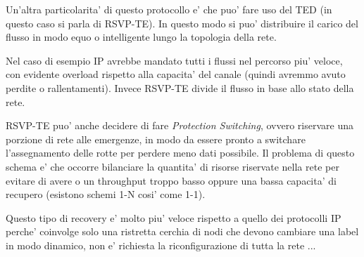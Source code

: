 Un'altra particolarita' di questo protocollo e' che puo' fare uso del TED (in questo caso si parla di RSVP-TE).
In questo modo si puo' distribuire il carico del flusso in modo equo o intelligente lungo la topologia della rete.



Nel caso di esempio IP avrebbe mandato tutti i flussi nel percorso piu' veloce, con evidente overload rispetto alla capacita' del canale (quindi avremmo avuto perdite o rallentamenti). Invece RSVP-TE divide il flusso in base allo stato della rete.


RSVP-TE puo' anche decidere di fare \textit{Protection Switching}, ovvero riservare una porzione di rete alle emergenze, in modo da essere pronto a switchare l'assegnamento delle rotte per perdere meno dati possibile. Il problema di questo schema e' che occorre bilanciare la quantita' di risorse riservate nella rete per evitare di avere o un throughput troppo basso oppure una bassa capacita' di recupero (esistono schemi 1-N cosi' come 1-1).

Questo tipo di recovery e' molto piu' veloce rispetto a quello dei protocolli IP perche' coinvolge solo una ristretta cerchia di nodi che devono cambiare una label in modo dinamico, non e' richiesta la riconfigurazione di tutta la rete ...


